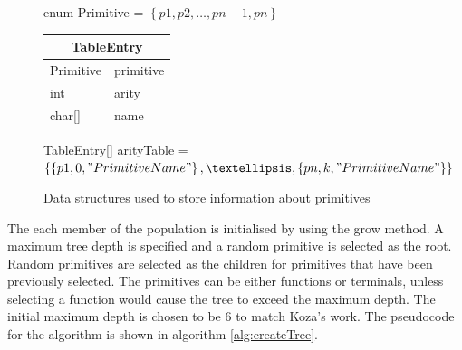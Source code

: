 \documentclass{article}
\begin{document}
        \begin{figure}[h]
            \centering
            
            enum Primitive = $\left \{p1,p2,…,pn-1,pn \right\}$
            
            \smallskip
            
            \begin{tabular}{|l l|}
                \hline
                \multicolumn{2}{|c|}{TableEntry}\\
                \hline
                Primitive & primitive \\
                int & arity\\
                char[] & name\\
                \hline
            \end{tabular}
            
            \bigskip
            
            TableEntry[] arityTable = $\left\{\left \{ p1,0,"PrimitiveName"\right\},…,\left\{ pn,k,"PrimitiveName"\right\}\right\}$
            
            \caption{Data structures used to store information about primitives}
            
            \label{struct:arity}
        \end{figure}
        
        The each member of the population is initialised by using the grow method. A maximum tree depth is specified and a random primitive is selected as the root. Random primitives are selected as the children for primitives that have been previously selected. The primitives can be either functions or terminals, unless selecting a function would cause the tree to exceed the maximum depth. The initial maximum depth is chosen to be 6 to match Koza's work. The pseudocode for the algorithm is shown in algorithm \ref{alg:createTree}.
        
\end{document}
